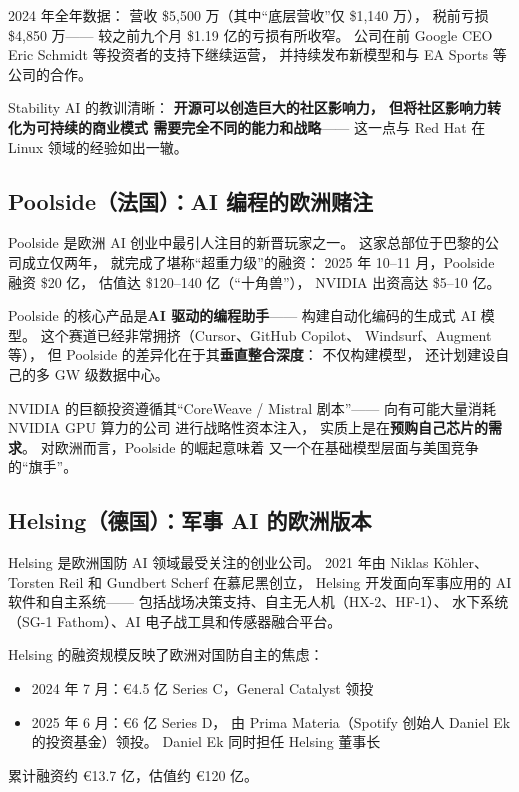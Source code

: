 2024 年全年数据：
营收 \$5,500 万（其中``底层营收''仅 \$1,140 万），
税前亏损 \$4,850 万——
较之前九个月 \$1.19 亿的亏损有所收窄。
公司在前 Google CEO Eric Schmidt 等投资者的支持下继续运营，
并持续发布新模型和与 EA Sports 等公司的合作。

Stability AI 的教训清晰：
\textbf{开源可以创造巨大的社区影响力，
但将社区影响力转化为可持续的商业模式
需要完全不同的能力和战略}——
这一点与 Red Hat 在 Linux 领域的经验如出一辙。

\subsection{Poolside（法国）：AI 编程的欧洲赌注}

Poolside 是欧洲 AI 创业中最引人注目的新晋玩家之一。
这家总部位于巴黎的公司成立仅两年，
就完成了堪称``超重力级''的融资：
2025 年 10--11 月，Poolside 融资 \$20 亿，
估值达 \$120--140 亿（``十角兽''），
NVIDIA 出资高达 \$5--10 亿。

Poolside 的核心产品是\textbf{AI 驱动的编程助手}——
构建自动化编码的生成式 AI 模型。
这个赛道已经非常拥挤（Cursor、GitHub Copilot、
Windsurf、Augment 等），
但 Poolside 的差异化在于其\textbf{垂直整合深度}：
不仅构建模型，
还计划建设自己的多 GW 级数据中心。

NVIDIA 的巨额投资遵循其``CoreWeave / Mistral 剧本''——
向有可能大量消耗 NVIDIA GPU 算力的公司
进行战略性资本注入，
实质上是在\textbf{预购自己芯片的需求}。
对欧洲而言，Poolside 的崛起意味着
又一个在基础模型层面与美国竞争的``旗手''。

\subsection{Helsing（德国）：军事 AI 的欧洲版本}

Helsing 是欧洲国防 AI 领域最受关注的创业公司。
2021 年由 Niklas Köhler、Torsten Reil 和 Gundbert Scherf
在慕尼黑创立，
Helsing 开发面向军事应用的 AI 软件和自主系统——
包括战场决策支持、自主无人机（HX-2、HF-1）、
水下系统（SG-1 Fathom）、AI 电子战工具和传感器融合平台。

Helsing 的融资规模反映了欧洲对国防自主的焦虑：
\begin{itemize}[noitemsep]
  \item 2024 年 7 月：€4.5 亿 Series C，General Catalyst 领投
  \item 2025 年 6 月：€6 亿 Series D，
        由 Prima Materia（Spotify 创始人 Daniel Ek 的投资基金）领投。
        Daniel Ek 同时担任 Helsing 董事长
\end{itemize}
累计融资约 €13.7 亿，估值约 €120 亿。

